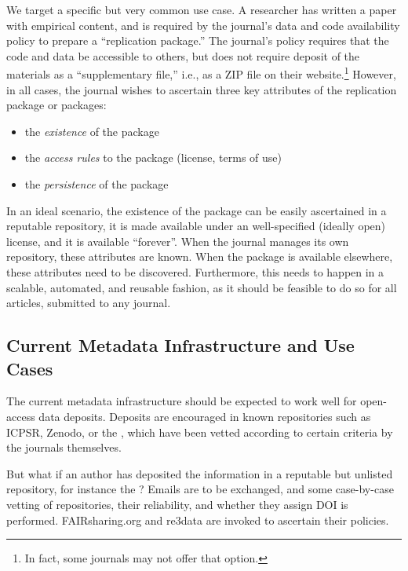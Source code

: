 We target a specific but very common use case. A researcher has written a paper with empirical content, and is required by the journal's data and code availability policy to prepare a ``replication package.'' The journal's policy requires that the code and data be accessible to others, but does not require deposit of the materials as a ``supplementary file,'' i.e., as a ZIP file on their website.\footnote{In fact, some journals may not offer that option.} However, in all cases, the journal wishes to ascertain three key attributes of the replication package or packages:
\begin{itemize}
    \item the \textit{existence} of the package
    \item the \textit{access rules} to the package (license, terms of use)
    \item the \textit{persistence} of the package
\end{itemize}
In an ideal scenario, the existence of the package can be easily ascertained in a reputable repository, it is made available under an well-specified (ideally open) license, and it is available ``forever''. When the journal manages its own repository, these attributes are known. When the package is available elsewhere, these attributes need to be discovered. Furthermore,  this needs to happen in a scalable,  automated, and reusable fashion, as it should be feasible to do so for all articles, submitted to any journal. 

\subsection{Current Metadata Infrastructure and Use Cases}
The current metadata infrastructure should be expected to work well for open-access data deposits. Deposits are encouraged in known repositories such as \ac{ICPSR}, Zenodo, or the , which have been vetted according to certain criteria by the journals themselves.

But what if an author has deposited the information in a reputable but unlisted repository, for instance the ? Emails are to be exchanged, and some case-by-case vetting of repositories, their reliability, and whether they assign \ac{DOI} is performed. FAIRsharing.org and re3data are invoked to ascertain their policies. 

